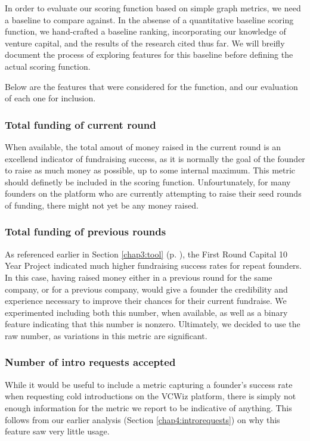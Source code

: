 In order to evaluate our scoring function based on simple graph metrics, we need a baseline to compare against. In the absense of a quantitative baseline scoring function, we hand-crafted a baseline ranking, incorporating our knowledge of venture capital, and the results of the research cited thus far. We will breifly document the process of exploring features for this baseline before defining the actual scoring function.

Below are the features that were considered for the function, and our evaluation of each one for inclusion.

\subsubsection{Total funding of current round}

When available, the total amout of money raised in the current round is an excellend indicator of fundraising success, as it is normally the goal of the founder to raise as much money as possible, up to some internal maximum. This metric should definetly be included in the scoring function. Unfourtunately, for many founders on the platform who are currently attempting to raise their seed rounds of funding, there might not yet be any money raised.

\subsubsection{Total funding of previous rounds}

As referenced earlier in Section \ref{chap3:tool} (p. \pageref{chap3:tool}), the First Round Capital 10 Year Project \cite{first-round-10-years} indicated much higher fundraising success rates for repeat founders. In this case, having raised money either in a previous round for the same company, or for a previous company, would give a founder the credibility and experience necessary to improve their chances for their current fundraise. We experimented including both this number, when available, as well as a binary feature indicating that this number is nonzero. Ultimately, we decided to use the raw number, as variations in this metric are significant.

\subsubsection{Number of intro requests accepted}

While it would be useful to include a metric capturing a founder's success rate when requesting cold introductions on the VCWiz platform, there is simply not enough information for the metric we report to be indicative of anything. This follows from our earlier analysis (Section \ref{chap4:introrequests}) on why this feature saw very little usage.

